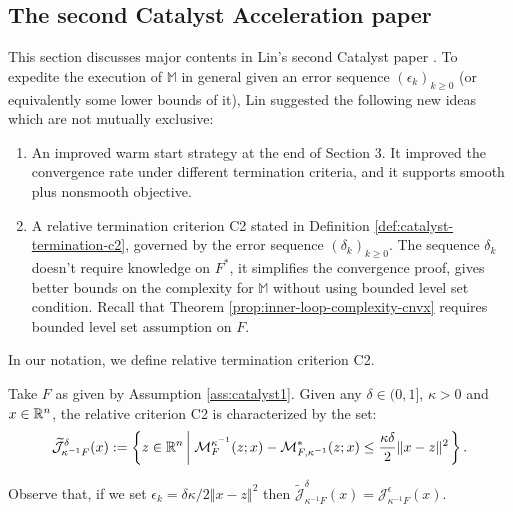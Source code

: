 \documentclass[12pt]{article}
\begin{document}
    \subsection{The second Catalyst Acceleration paper}\label{ssec:catalyst-second-paper}
        This section discusses major contents in Lin's second Catalyst paper \cite{lin_catalyst_2018}. 
        To expedite the execution of $\mathbb M$ in general given an error sequence $(\epsilon_k)_{k \ge 0}$ (or equivalently some lower bounds of it), Lin suggested the following new ideas which are not  mutually exclusive: 
        \begin{enumerate}
            \item An improved warm start strategy at the end of Section 3. 
            It improved the convergence rate under different termination criteria, and it supports smooth plus nonsmooth objective. 
            \item A relative termination criterion C2 stated in Definition \ref{def:catalyst-termination-c2}, governed by the error sequence $(\delta_k)_{k \ge 0}$. 
            The sequence $\delta_k$ doesn't require knowledge on $F^*$, it simplifies the convergence proof, gives better bounds on the complexity for $\mathbb M$ without using bounded level set condition. 
            Recall that Theorem \ref{prop:inner-loop-complexity-cnvx} requires bounded level set assumption on $F$. 
        \end{enumerate}
        In our notation, we define relative termination criterion C2.
        \begin{definition}\label{def:catalyst-termination-c2}
            Take $F$ as given by Assumption \ref{ass:catalyst1}. 
            Given any $\delta \in (0, 1]$, $\kappa > 0$ and $x \in \mathbb R^n$, the relative criterion C2 is characterized by the set: 
            \begin{align*}
                \widetilde{\mathcal J}_{\kappa^{-1}F}^\delta (x)
                := 
                \left\lbrace
                    z \in \mathbb R^n \left| \;
                        \mathcal M_F^{\kappa^{-1}}(z; x) - 
                        \mathcal M^*_{F, \kappa^{-1}}(z; x) 
                        \le \frac{\kappa\delta}{2}\Vert x - z\Vert^2
                    \right.
                \right\rbrace. 
            \end{align*}
        \end{definition}
        Observe that, if we set $\epsilon_{k} = \delta\kappa/2\Vert x - z\Vert^2$ then $\widetilde{\mathcal J}_{\kappa^{-1}F}^{\delta} (x) = \mathcal J_{\kappa^{-1}F}^\epsilon (x)$. 
\end{document}
